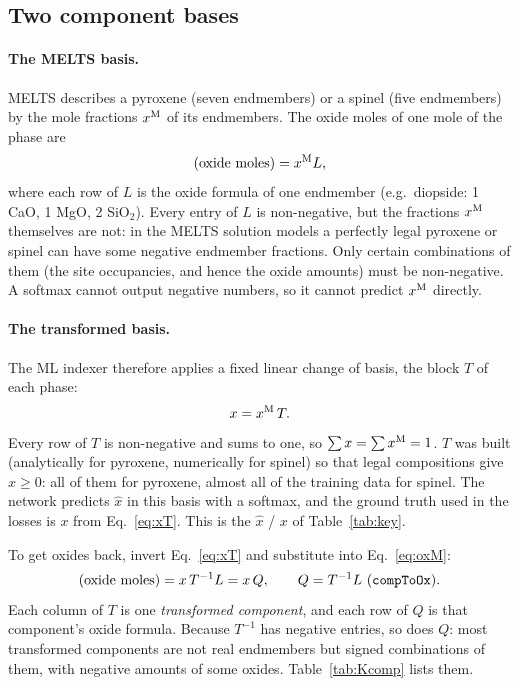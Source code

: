 \documentclass[11pt]{article}
\newcommand{\code}[1]{\texttt{\detokenize{#1}}}
\begin{document}
\subsection{Two component bases}

\paragraph{The MELTS basis.} MELTS describes a pyroxene (seven endmembers) or a spinel
(five endmembers) by the mole fractions $x^{\rm M}$ of its endmembers. The oxide moles of
one mole of the phase are
\begin{equation}
  (\text{oxide moles}) = x^{\rm M} L,
  \label{eq:oxM}
\end{equation}
where each row of $L$ is the oxide formula of one endmember (e.g.\ diopside:
1 CaO, 1 MgO, 2 SiO$_2$). Every entry of $L$ is non-negative, but the fractions
$x^{\rm M}$ themselves are not: in the MELTS solution models a perfectly legal pyroxene or
spinel can have some negative endmember fractions. Only certain combinations of them (the
site occupancies, and hence the oxide amounts) must be non-negative. A softmax cannot
output negative numbers, so it cannot predict $x^{\rm M}$ directly.

\paragraph{The transformed basis.} The ML indexer therefore applies a fixed linear change of
basis, the \code{PxSpTransform} block $T$ of each phase:
\begin{equation}
  x = x^{\rm M}\, T .
  \label{eq:xT}
\end{equation}
Every row of $T$ is non-negative and sums to one, so $\sum x = \sum x^{\rm M} = 1$. $T$ was
built (analytically for pyroxene, numerically for spinel) so that legal compositions give
$x \ge 0$: all of them for pyroxene, almost all of the training data for spinel. The network predicts $\hat x$ in this basis with a
softmax, and the ground truth used in the losses is $x$ from Eq.~\eqref{eq:xT}. This is the
$\hat x$ / $x$ of Table~\ref{tab:key}.

To get oxides back, invert Eq.~\eqref{eq:xT} and substitute into Eq.~\eqref{eq:oxM}:
\begin{equation}
  (\text{oxide moles}) = x\, T^{-1} L = x\, Q, \qquad Q = T^{-1} L \ (\code{compToOx}).
  \label{eq:oxQ}
\end{equation}
Each column of $T$ is one \emph{transformed component}, and each row of $Q$ is that
component's oxide formula. Because $T^{-1}$ has negative entries, so does $Q$: most
transformed components are not real endmembers but signed combinations of them, with
negative amounts of some oxides. Table~\ref{tab:Kcomp} lists them.
\end{document}
